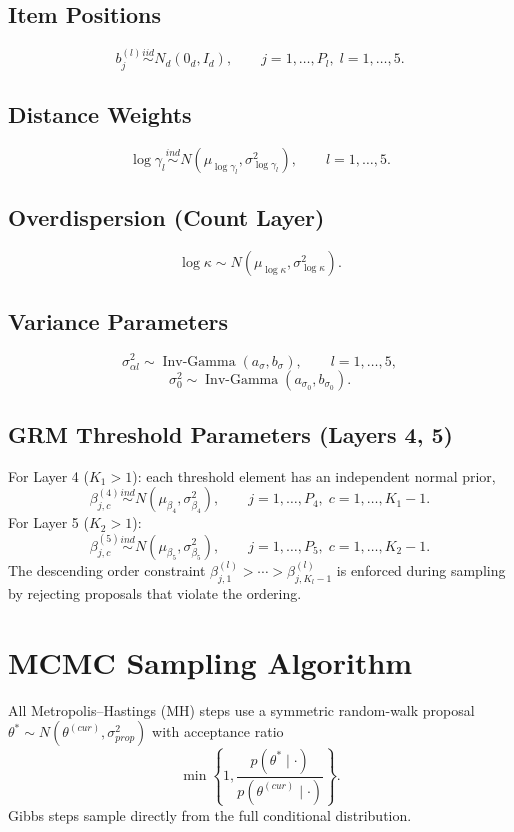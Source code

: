 \documentclass[11pt]{article}
\begin{document}
\subsection{Item Positions}
\[
b_j^{(l)} \overset{iid}{\sim} N_d(0_d,I_d),
\qquad j=1,\dots,P_l,\; l=1,\dots,5.
\]

\subsection{Distance Weights}
\[
\log \gamma_l \overset{ind}{\sim} N(\mu_{\log \gamma_l},\sigma_{\log \gamma_l}^2),
\qquad l=1,\dots,5.
\]

\subsection{Overdispersion (Count Layer)}
\[
\log \kappa \sim N(\mu_{\log \kappa},\sigma_{\log \kappa}^2).
\]

\subsection{Variance Parameters}
\[
\sigma_{\alpha l}^2 \sim \operatorname{Inv\text{-}Gamma}(a_\sigma,b_\sigma),
\qquad l=1,\dots,5,
\]
\[
\sigma_0^2 \sim \operatorname{Inv\text{-}Gamma}(a_{\sigma_0},b_{\sigma_0}).
\]

\subsection{GRM Threshold Parameters (Layers 4, 5)}
For Layer 4 ($K_1 > 1$): each threshold element has an independent normal prior,
\[
\beta_{j,c}^{(4)} \overset{ind}{\sim} N(\mu_{\beta_4}, \sigma_{\beta_4}^2),
\qquad j=1,\dots,P_4,\; c=1,\dots,K_1-1.
\]
For Layer 5 ($K_2 > 1$):
\[
\beta_{j,c}^{(5)} \overset{ind}{\sim} N(\mu_{\beta_5}, \sigma_{\beta_5}^2),
\qquad j=1,\dots,P_5,\; c=1,\dots,K_2-1.
\]
The descending order constraint $\beta_{j,1}^{(l)} > \cdots > \beta_{j,K_l-1}^{(l)}$ is enforced during sampling by rejecting proposals that violate the ordering.

\section{MCMC Sampling Algorithm}

All Metropolis--Hastings (MH) steps use a symmetric random-walk proposal $\theta^*\sim N(\theta^{(cur)},\sigma_{prop}^2)$ with acceptance ratio
\[
\min\left\{1,\frac{p(\theta^*\mid \cdot)}{p(\theta^{(cur)}\mid \cdot)}\right\}.
\]
Gibbs steps sample directly from the full conditional distribution.
\end{document}
